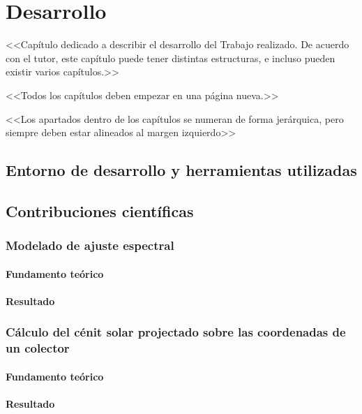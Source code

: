 \chapter{Desarrollo} \label{chp:desarrollo}

<<Capítulo dedicado a describir el desarrollo del Trabajo realizado. De acuerdo con el tutor, este capítulo puede tener distintas estructuras, e incluso pueden existir varios capítulos.>>

<<Todos los capítulos deben empezar en una página nueva.>>

<<Los apartados dentro de los capítulos se numeran de forma jerárquica, pero siempre deben estar alineados al margen izquierdo>>

\section{Entorno de desarrollo y herramientas utilizadas} \label{sct:desarrollo:entorno}

\section{Contribuciones científicas} \label{sct:desarrollo:contribuciones_cientificas}

\subsection{Modelado de ajuste espectral}

\subsubsection{Fundamento teórico}

\subsubsection{Resultado}

\subsection{Cálculo del cénit solar projectado sobre las coordenadas de un colector}

\subsubsection{Fundamento teórico}

\subsubsection{Resultado}


